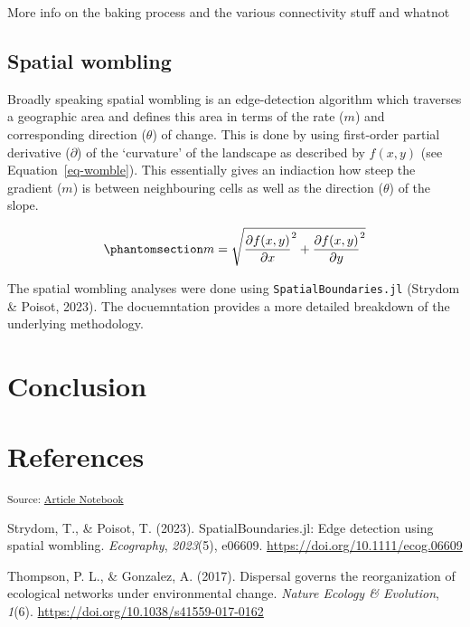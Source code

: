 \documentclass[
]{agujournal2019}
\newlength{\cslhangindent}
\newenvironment{CSLReferences}[2] %
 {\begin{list}{}{%
  \setlength{\itemindent}{0pt}
  \setlength{\leftmargin}{0pt}
  \setlength{\parsep}{0pt}
  \ifodd #1
   \setlength{\leftmargin}{\cslhangindent}
   \setlength{\itemindent}{-1\cslhangindent}
  \fi
  \setlength{\itemsep}{#2\baselineskip}}}
 {\end{list}}
\begin{document}
More info on the baking process and the various connectivity stuff and
whatnot

\subsection{Spatial wombling}\label{spatial-wombling}

Broadly speaking spatial wombling is an edge-detection algorithm which
traverses a geographic area and defines this area in terms of the rate
(\(m\)) and corresponding direction (\(\theta\)) of change. This is done
by using first-order partial derivative (\(\partial\)) of the
`curvature' of the landscape as described by \(f(x,y)\) (see
Equation~\ref{eq-womble}). This essentially gives an indiaction how
steep the gradient (\(m\)) is between neighbouring cells as well as the
direction (\(\theta\)) of the slope.

\begin{equation}\phantomsection\label{eq-womble}{
m = \sqrt{\frac{\partial f(x,y)}{\partial x}^2 + \frac{\partial f(x,y)}{\partial y}^2}
}\end{equation}

The spatial wombling analyses were done using
\texttt{SpatialBoundaries.jl} (Strydom \& Poisot, 2023). The
docuemntation provides a more detailed breakdown of the underlying
methodology.

\section{Conclusion}\label{conclusion}

\section*{References}\label{references}

\vspace{1em}

\textsubscript{Source:
\href{https://PoisotLab.github.io/ms_womble_ya_net/index.qmd.html}{Article
Notebook}}

\label{refs}
\begin{CSLReferences}{1}{0}
Strydom, T., \& Poisot, T. (2023). {SpatialBoundaries}.jl: Edge
detection using spatial wombling. \emph{Ecography}, \emph{2023}(5),
e06609. \url{https://doi.org/10.1111/ecog.06609}

Thompson, P. L., \& Gonzalez, A. (2017). Dispersal governs the
reorganization of ecological networks under environmental change.
\emph{Nature Ecology \& Evolution}, \emph{1}(6).
\url{https://doi.org/10.1038/s41559-017-0162}

\end{CSLReferences}
\end{document}
